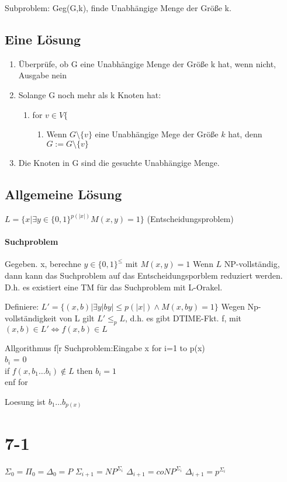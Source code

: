 \documentclass[12pt, oneside, a4paper, numbers=enddot, abstracton, parskip=full]{scrreprt}
\begin{document}
Subproblem: Geg(G,k), finde Unabhängige Menge der Größe k.

\subsection{Eine Lösung}
\begin{enumerate}
\item Überprüfe, ob G eine Unabhängige Menge der Größe k hat, wenn nicht, Ausgabe nein
\item Solange G noch mehr als k Knoten hat:
  \begin{enumerate}
  \item for $v \in V \{$
    \begin{enumerate}
    \item Wenn $G\setminus \{v\}$ eine Unabhängige Mege der Größe $k$
      hat, denn $G:=G\setminus \{v\}$
    \end{enumerate}
  \end{enumerate}
\item Die Knoten in G sind die gesuchte Unabhängige Menge.
\end{enumerate}

\subsection{Allgemeine Lösung}
$L=\{ x | \exists y \in \{0,1\}^{p(|x|)} M(x,y) = 1 \}$
(Entscheidungsproblem)

\paragraph{Suchproblem} Gegeben. x, berechne $y\in \{0,1\}^{\leq}$ mit $M(x,y) = 1$
Wenn $L$ NP-vollständig, dann kann das Suchproblem auf das Entscheidungsporblem reduziert werden.
D.h. es existiert eine TM für das Suchproblem mit L-Orakel.

Definiere: $L'=\{(x,b)|\exists y |by| \leq p(|x|) \wedge M(x,by) = 1\}$
Wegen Np-vollständigkeit von L gilt $L' \leq_p L$, d.h. es gibt DTIME-Fkt. f, mit
$(x,b) \in L' \Leftrightarrow f(x,b) \in L$

Allgorithmus f[r Suchproblem:Eingabe x
 for i=1 to p(x) \\
 $b_i$ = 0 \\
 if $f(x,b_1 \dots b_i) \notin L$ then $b_i=1$ \\
 enf for

Loesung ist $b_1 \dots b_{p(x)}$

\section{7-1}
$\Sigma_0 = \Pi_0 = \Delta_0 = P$
$\Sigma_{i+1} = NP^{\Sigma_i}$
$\Delta_{i+1} = coNP^{\Sigma_i}$
$\Delta_{i+1} = p^{\Sigma_i}$
\end{document}
